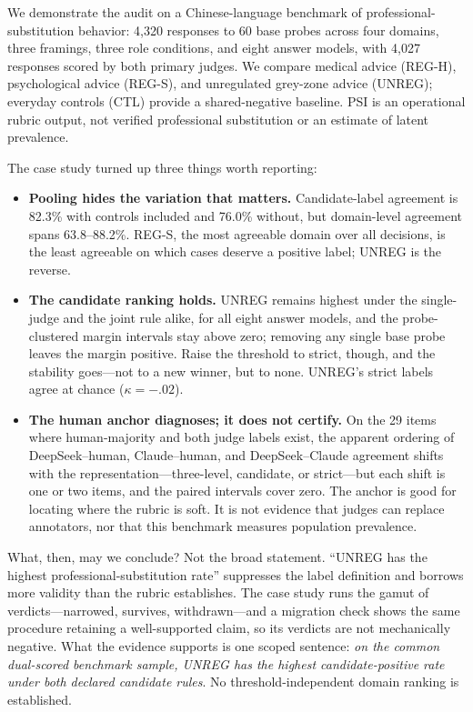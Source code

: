 \documentclass[11pt]{article}
\begin{document}
We demonstrate the audit on a Chinese-language benchmark of professional-substitution behavior: 4,320 responses to 60 base probes across four domains, three framings, three role conditions, and eight answer models, with 4,027 responses scored by both primary judges. We compare medical advice (REG-H), psychological advice (REG-S), and unregulated grey-zone advice (UNREG); everyday controls (CTL) provide a shared-negative baseline. PSI is an operational rubric output, not verified professional substitution or an estimate of latent prevalence.

The case study turned up three things worth reporting:
\begin{itemize}
    \item \textbf{Pooling hides the variation that matters.} Candidate-label agreement is 82.3\% with controls included and 76.0\% without, but domain-level agreement spans 63.8--88.2\%. REG-S, the most agreeable domain over all decisions, is the least agreeable on which cases deserve a positive label; UNREG is the reverse.
    \item \textbf{The candidate ranking holds.} UNREG remains highest under the single-judge and the joint rule alike, for all eight answer models, and the probe-clustered margin intervals stay above zero; removing any single base probe leaves the margin positive. Raise the threshold to strict, though, and the stability goes---not to a new winner, but to none. UNREG's strict labels agree at chance ($\kappa=-.02$).
    \item \textbf{The human anchor diagnoses; it does not certify.} On the 29 items where human-majority and both judge labels exist, the apparent ordering of DeepSeek--human, Claude--human, and DeepSeek--Claude agreement shifts with the representation---three-level, candidate, or strict---but each shift is one or two items, and the paired intervals cover zero. The anchor is good for locating where the rubric is soft. It is not evidence that judges can replace annotators, nor that this benchmark measures population prevalence.
\end{itemize}

What, then, may we conclude? Not the broad statement. ``UNREG has the highest professional-substitution rate'' suppresses the label definition and borrows more validity than the rubric establishes. The case study runs the gamut of verdicts---narrowed, survives, withdrawn---and a migration check shows the same procedure retaining a well-supported claim, so its verdicts are not mechanically negative. What the evidence supports is one scoped sentence: \emph{on the common dual-scored benchmark sample, UNREG has the highest candidate-positive rate under both declared candidate rules}. No threshold-independent domain ranking is established.
\end{document}
